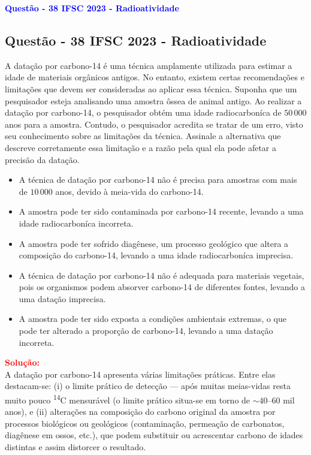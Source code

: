 \begin{flushleft}
\textbf{\textcolor{blue}{\Large Quest\~ao - 38 IFSC 2023 - Radioatividade}}\\
\noindent

\subsection{Quest\~ao - 38 IFSC 2023 - Radioatividade}
A data\c{c}\~ao por carbono-14 \'e uma t\'ecnica amplamente utilizada para estimar a idade de materiais org\^anicos antigos. No entanto, 
existem certas recomenda\c{c}\~oes e limita\c{c}\~oes que devem ser consideradas ao aplicar essa t\'ecnica. Suponha que um pesquisador esteja 
analisando uma amostra \^ossea de animal antigo. Ao realizar a data\c{c}\~ao por carbono-14, o pesquisador obt\'em uma idade radiocarbon\'ica 
de $50\,000$ anos para a amostra. Contudo, o pesquisador acredita se tratar de um erro, visto seu conhecimento sobre as limita\c{c}\~oes da t\'ecnica. 
Assinale a alternativa que descreve corretamente essa limita\c{c}\~ao e a raz\~ao pela qual ela pode afetar a precis\~ao da data\c{c}\~ao.

\begin{itemize}
\item[(A)] A t\'ecnica de data\c{c}\~ao por carbono-14 n\~ao \'e precisa para amostras com mais de $10\,000$ anos, devido \`a meia-vida do carbono-14.
\item[(B)] A amostra pode ter sido contaminada por carbono-14 recente, levando a uma idade radiocarbon\'ica incorreta.
\item[(C)] A amostra pode ter sofrido diag\^enese, um processo geol\'ogico que altera a composi\c{c}\~ao do carbono-14, levando a uma idade radiocarbon\'ica imprecisa.
\item[(D)] A t\'ecnica de data\c{c}\~ao por carbono-14 n\~ao \'e adequada para materiais vegetais, pois os organismos podem absorver carbono-14 de diferentes fontes, levando a uma data\c{c}\~ao imprecisa.
\item[(E)] A amostra pode ter sido exposta a condi\c{c}\~oes ambientais extremas, o que pode ter alterado a propor\c{c}\~ao de carbono-14, levando a uma data\c{c}\~ao incorreta.
\end{itemize}

\vspace{0.5cm}

\textcolor{red}{\textbf{Solução:}}\\

A data\c{c}\~ao por carbono-14 apresenta v\'arias limita\c{c}\~oes pr\'aticas. Entre elas destacam-se: (i) o limite pr\'atico de detec\c{c}\~ao — ap\'os muitas meias-vidas resta muito pouco \textsuperscript{14}C mensur\'avel (o limite pr\'atico situa-se em torno de $\sim 40$–$60$ mil anos), e (ii) altera\c{c}\~oes na composi\c{c}\~ao do carbono original da amostra por processos biol\'ogicos ou geol\'ogicos (contamina\c{c}\~ao, permea\c{c}\~ao de carbonatos, diag\^enese em ossos, etc.), que podem substituir ou acrescentar carbono de idades distintas e assim distorcer o resultado.


\end{flushleft}
